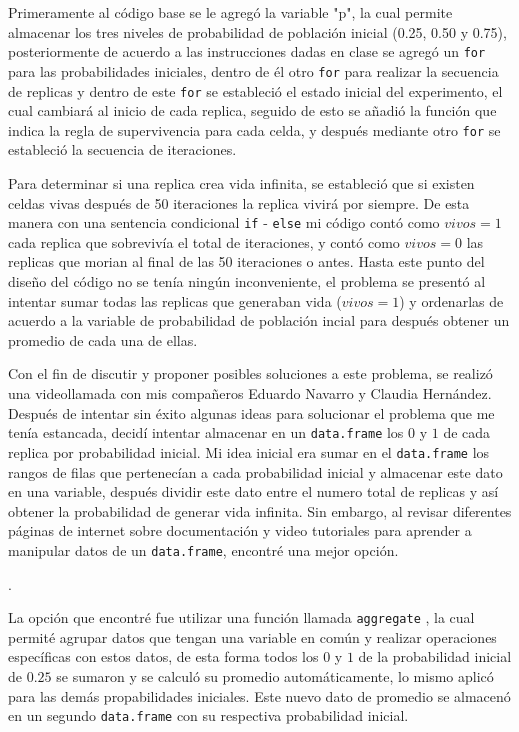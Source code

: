 \documentclass{article}
\begin{document}
Primeramente al código base se le agregó la variable "p", la cual permite almacenar los tres niveles de probabilidad de población inicial (0.25, 0.50 y 0.75), posteriormente de acuerdo a las instrucciones dadas en clase se agregó un \texttt{for} para las probabilidades iniciales, dentro de él otro \texttt{for} para realizar la secuencia de replicas y dentro de este \texttt{for} se estableció el estado inicial del experimento, el cual cambiará al inicio de cada replica, seguido de esto se añadió la función que indica la regla de supervivencia para cada celda, y después mediante otro \texttt{for} se estableció la secuencia de iteraciones.
\bigskip

Para determinar si una replica crea vida infinita, se estableció que si existen celdas vivas después de 50 iteraciones la replica vivirá por siempre. De esta manera con una sentencia condicional \texttt{if} - \texttt{else} mi código contó como $vivos =1$ cada replica que sobrevivía el total de iteraciones, y contó como $vivos =0$ las replicas que morian al final de las 50 iteraciones o antes. Hasta este punto del diseño del código no se tenía ningún inconveniente, el problema se presentó al intentar sumar todas las replicas que generaban vida ($vivos =1$) y ordenarlas de acuerdo a la variable de probabilidad de población incial para después obtener un promedio de cada una de ellas.     
\bigskip

Con el fin de discutir y proponer posibles soluciones a este problema, se realizó una videollamada con mis compañeros Eduardo Navarro y Claudia Hernández. Después de intentar sin éxito algunas ideas para solucionar el problema que me tenía estancada, decidí intentar almacenar en un \texttt{data.frame} los $0$ y $1$ de cada replica por probabilidad inicial. Mi idea inicial era sumar en el \texttt{data.frame} los rangos de filas que pertenecían a cada probabilidad inicial y almacenar este dato en una variable, después dividir este dato entre el numero total de replicas y así obtener la probabilidad de generar vida infinita. Sin embargo, al revisar diferentes páginas de internet sobre documentación \citep{3,4} y video tutoriales \citep{5} para aprender a manipular datos de un \texttt{data.frame}, encontré una mejor opción. 

\newpage
.
\bigskip
\bigskip

La opción que encontré fue utilizar una función llamada \texttt{aggregate} \citep{6,7}, la cual permité agrupar datos que tengan una variable en común y realizar operaciones específicas con estos datos, de esta forma todos los $0$ y $1$ de la probabilidad inicial de $0.25$ se sumaron y se calculó su promedio automáticamente, lo mismo aplicó para las demás propabilidades iniciales. Este nuevo dato de promedio se almacenó en un segundo \texttt{data.frame} con su respectiva probabilidad inicial. 
\bigskip
\end{document}
